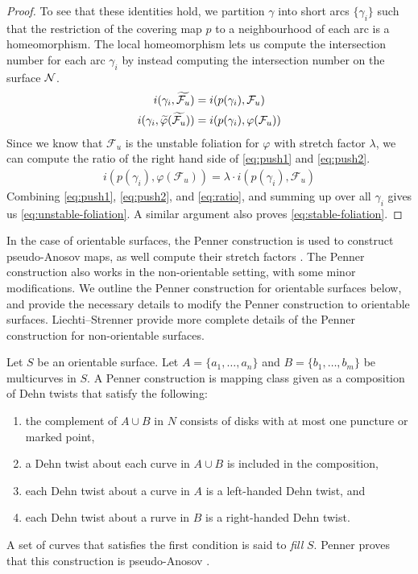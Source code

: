 \begin{proof}
  To see that these identities hold, we partition $\gamma$ into short arcs $\{\gamma_i\}$ such that the restriction of the covering map $p$ to a neighbourhood of each arc is a homeomorphism.
  The local homeomorphism lets us compute the intersection number for each arc $\gamma_i$ by instead computing the intersection number on the surface $\mathcal{N}$.
  \begin{align}
  \label{eq:push1}
    i(\gamma_i, \widetilde{\mathcal{F}_u}) &= i(p(\gamma_i), \mathcal{F}_u) \\
  \label{eq:push2}
    i(\gamma_i, \widetilde{\varphi}(\widetilde{\mathcal{F}_u})) &= i(p(\gamma_i), \varphi(\mathcal{F}_u))
  \end{align}
  Since we know that $\mathcal{F}_u$ is the unstable foliation for $\varphi$ with stretch factor $\lambda$, we can compute the ratio of the right hand side of \eqref{eq:push1} and \eqref{eq:push2}.
  \begin{align}
      \label{eq:ratio}
      i(p(\gamma_i), \varphi(\mathcal{F}_u)) = \lambda \cdot i(p(\gamma_i), \mathcal{F}_u)
  \end{align}
  Combining \eqref{eq:push1}, \eqref{eq:push2}, and \eqref{eq:ratio}, and summing up over all $\gamma_i$ gives us \eqref{eq:unstable-foliation}. A similar argument also proves \eqref{eq:stable-foliation}.
\end{proof}

In the case of orientable surfaces, the Penner construction is used to construct pseudo-Anosov maps, as well compute their stretch factors \cite{penner1988construction}. The Penner construction also works in the non-orientable setting, with some minor modifications. We outline the Penner construction for orientable surfaces below, and provide the necessary details to modify the Penner construction to orientable surfaces.  Liechti--Strenner \cite[Section 2]{LS} provide more complete details of the Penner construction for non-orientable surfaces.

 Let $S$ be an orientable surface.  Let $A = \{a_1,\dots,a_n\}$
and $B = \{b_1,\dots,b_m\}$ be multicurves in $S$.  A Penner construction is mapping class given as a composition of Dehn twists that satisfy the following:
\begin{enumerate}
\item the complement of $A\cup B$ in $N$ consists of disks with at most one puncture or marked point,
    \item a Dehn twist about each curve in $A\cup B$ is included in the composition,
    \item each Dehn twist about a curve in $A$ is a left-handed Dehn twist, and
    \item each Dehn twist about a rurve in $B$ is a right-handed Dehn twist.
\end{enumerate}
  A set of curves that satisfies the first condition is said to {\it fill} $S$.  Penner proves that this construction is pseudo-Anosov \cite{penner1988construction}.

